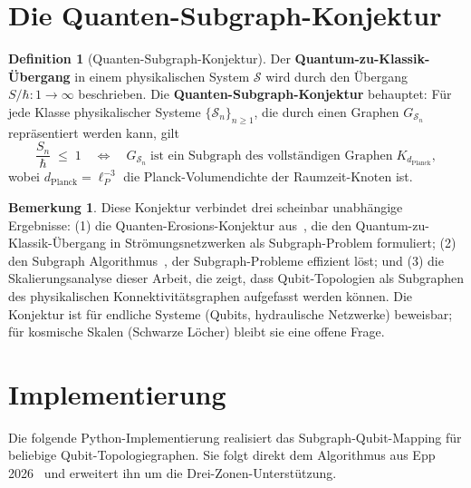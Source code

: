 ﻿\documentclass[a4paper,12pt]{article}
\theoremstyle{definition}
\newtheorem{definition}{Definition}
\newtheorem{bemerkung}{Bemerkung}
\begin{document}
\section{Die Quanten-Subgraph-Konjektur}
\label{sec:konjektur}

\begin{definition}[Quanten-Subgraph-Konjektur]
\label{def:konjektur}
Der \textbf{Quantum-zu-Klassik-Übergang} in einem physikalischen System $\mathcal{S}$
wird durch den Übergang $S/\hbar: 1 \to \infty$ beschrieben. Die
\textbf{Quanten-Subgraph-Konjektur} behauptet: Für jede Klasse physikalischer
Systeme $\{\mathcal{S}_n\}_{n\geq 1}$, die durch einen Graphen $G_{\mathcal{S}_n}$
repräsentiert werden kann, gilt
\[
  \frac{S_n}{\hbar} \;\leq\; 1
  \quad\Longleftrightarrow\quad
  G_{\mathcal{S}_n} \;\text{ist ein Subgraph des vollständigen Graphen}\;
  K_{d_\mathrm{Planck}},
\]
wobei $d_\mathrm{Planck} = \ell_P^{-3}$ die Planck-Volumendichte der Raumzeit-Knoten ist.
\end{definition}

\begin{bemerkung}
Diese Konjektur verbindet drei scheinbar unabhängige Ergebnisse:
(1) die Quanten-Erosions-Konjektur aus~\cite{epp2026cnyn}, die den
Quantum-zu-Klassik-Übergang in Strömungsnetzwerken als Subgraph-Problem formuliert;
(2) den Subgraph Algorithmus~\cite{epp2026subgraph}, der Subgraph-Probleme effizient
löst; und (3) die Skalierungsanalyse dieser Arbeit, die zeigt, dass
Qubit-Topologien als Subgraphen des physikalischen Konnektivitätsgraphen aufgefasst
werden können. Die Konjektur ist für endliche Systeme (Qubits, hydraulische Netzwerke)
beweisbar; für kosmische Skalen (Schwarze Löcher) bleibt sie eine offene Frage.
\end{bemerkung}

\section{Implementierung}
\label{sec:implementierung}

Die folgende Python-Implementierung realisiert das Subgraph-Qubit-Mapping für
beliebige Qubit-Topologiegraphen. Sie folgt direkt dem Algorithmus aus
Epp 2026~\cite{epp2026subgraph} und erweitert ihn um die Drei-Zonen-Unterstützung.
\end{document}

